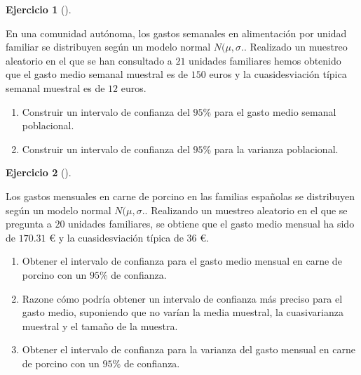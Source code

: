 \documentclass[
  a4paper,
]{scrreport}
\theoremstyle{definition}
\newtheorem{exercise}{Ejercicio}[chapter]
\theoremstyle{remark}
\begin{document}
\begin{exercise}[]\protect\hypertarget{exr-intervalo-confianza-media-varianza-gasto-alimentacion}{}\label{exr-intervalo-confianza-media-varianza-gasto-alimentacion}

En una comunidad autónoma, los gastos semanales en alimentación por
unidad familiar se distribuyen según un modelo normal \(N(\mu,\sigma.\).
Realizado un muestreo aleatorio en el que se han consultado a \(21\)
unidades familiares hemos obtenido que el gasto medio semanal muestral
es de \(150\) euros y la cuasidesviación típica semanal muestral es de
\(12\) euros.

\begin{enumerate}
\def\labelenumi{\alph{enumi}.}
\item
  Construir un intervalo de confianza del \(95\)\% para el gasto medio
  semanal poblacional.
\item
  Construir un intervalo de confianza del \(95\)\% para la varianza
  poblacional.
\end{enumerate}

\end{exercise}

\begin{exercise}[]\protect\hypertarget{exr-intervalo-confianza-media-varianza-gasto-porcino}{}\label{exr-intervalo-confianza-media-varianza-gasto-porcino}

Los gastos mensuales en carne de porcino en las familias españolas se
distribuyen según un modelo normal \(N(\mu, \sigma.\). Realizando un
muestreo aleatorio en el que se pregunta a \(20\) unidades familiares,
se obtiene que el gasto medio mensual ha sido de \(170.31\) € y la
cuasidesviación típica de \(36\) €.

\begin{enumerate}
\def\labelenumi{\alph{enumi}.}
\item
  Obtener el intervalo de confianza para el gasto medio mensual en carne
  de porcino con un \(95\)\% de confianza.
\item
  Razone cómo podría obtener un intervalo de confianza más preciso para
  el gasto medio, suponiendo que no varían la media muestral, la
  cuasivarianza muestral y el tamaño de la muestra.
\item
  Obtener el intervalo de confianza para la varianza del gasto mensual
  en carne de porcino con un \(95\)\% de confianza.
\end{enumerate}

\end{exercise}
\end{document}
